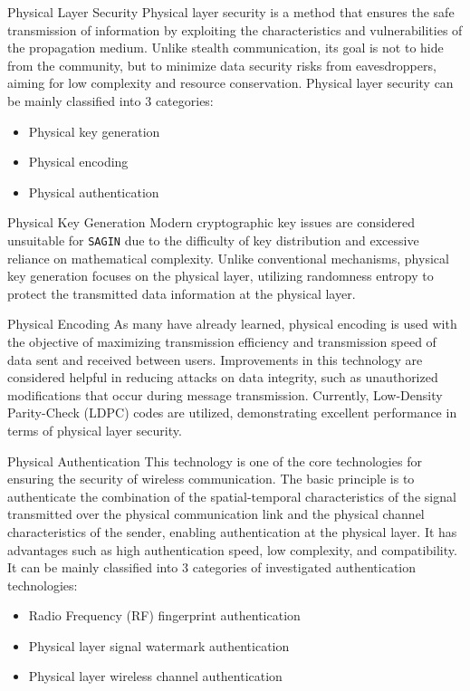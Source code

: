 \documentclass[11pt]{beamer}
\begin{document}
\begin{frame}{Physical Layer Security}
  Physical layer security is a method that ensures the safe transmission of information by exploiting the characteristics and vulnerabilities of the propagation medium. Unlike stealth communication, its goal is not to hide from the community, but to minimize data security risks from eavesdroppers, aiming for low complexity and resource conservation. Physical layer security can be mainly classified into $3$ categories:
  \begin{itemize}
    \item Physical key generation
    \item Physical encoding
    \item Physical authentication
  \end{itemize}
\end{frame}

\begin{frame}{Physical Key Generation}
  Modern cryptographic key issues are considered unsuitable for \texttt{SAGIN} due to the difficulty of key distribution and excessive reliance on mathematical complexity. Unlike conventional mechanisms, physical key generation focuses on the physical layer, utilizing randomness entropy to protect the transmitted data information at the physical layer.
\end{frame}

\begin{frame}{Physical Encoding}
  As many have already learned, physical encoding is used with the objective of maximizing transmission efficiency and transmission speed of data sent and received between users. Improvements in this technology are considered helpful in reducing attacks on data integrity, such as unauthorized modifications that occur during message transmission. Currently, Low-Density Parity-Check (LDPC) codes are utilized, demonstrating excellent performance in terms of physical layer security.
\end{frame}

\begin{frame}{Physical Authentication}
  This technology is one of the core technologies for ensuring the security of wireless communication. The basic principle is to authenticate the combination of the spatial-temporal characteristics of the signal transmitted over the physical communication link and the physical channel characteristics of the sender, enabling authentication at the physical layer. It has advantages such as high authentication speed, low complexity, and compatibility. It can be mainly classified into $3$ categories of investigated authentication technologies:
  \begin{itemize}
    \item Radio Frequency (RF) fingerprint authentication
    \item Physical layer signal watermark authentication
    \item Physical layer wireless channel authentication
  \end{itemize}
\end{frame}
\end{document}
